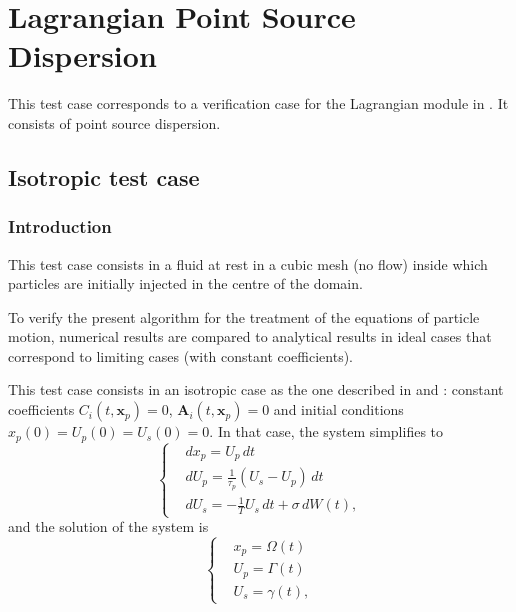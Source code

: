\renewcommand{\IMAGES}{../LAGR_POINT_SOURCE_DISPERSION/IMAGES}

\newcommand{\lra}[1]{\langle #1 \rangle }
\chapter{Lagrangian Point Source Dispersion}
\label{LAGR:case:lagr_point_source_dispersion}

This test case corresponds to a verification case for the Lagrangian module in \CS.
It consists of point source dispersion.

\section{Isotropic test case}
\subsection{Introduction}
This test case consists in a fluid at rest in a cubic mesh (no flow) inside which particles are initially injected  in the centre of the domain.

To verify the present algorithm for the treatment of the equations of particle motion, numerical results are compared to analytical results in ideal cases that correspond to limiting cases (with constant coefficients).

This test case consists in an isotropic case as the one described in \cite{Rep1} and \cite{Rep2}: constant coefficients $C_i(t,\mathbf{x}_p) = 0$, $\mathbf{A}_i(t,\mathbf{x}_p) = 0$ and initial conditions $x_p(0)=U_p(0)=U_s(0)=0$.
In that case, the system simplifies to
\begin{equation} \label{eq:lagr:num_schem:syst}
\left\{\begin{aligned}
& dx_p = U_p\, dt \\
& dU_p = \frac{1}{\tau_p}(U_s-U_p)\, dt \\
& dU_s = -\frac{1}{T}U_s\,dt + \sigma\, dW(t),
\end{aligned}\right.
\end{equation}
and the solution of the system is
\begin{equation} \label{eq:lagr:num_schem:solved}
\left\{\begin{aligned}
& x_p = \Omega(t) \\
& U_p = \Gamma(t) \\
& U_s = \gamma(t),
\end{aligned}\right.
\end{equation}

